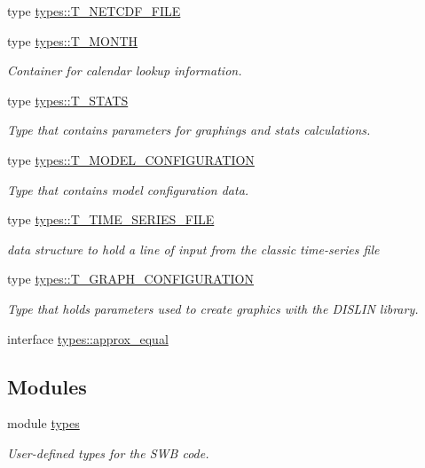 \begin{DoxyCompactItemize}
type \hyperlink{typetypes_1_1_t___n_e_t_c_d_f___f_i_l_e}{types::T\_\-NETCDF\_\-FILE}
\item 
type \hyperlink{typetypes_1_1_t___m_o_n_t_h}{types::T\_\-MONTH}
\begin{DoxyCompactList}\small\item\em Container for calendar lookup information. \item\end{DoxyCompactList}\item 
type \hyperlink{typetypes_1_1_t___s_t_a_t_s}{types::T\_\-STATS}
\begin{DoxyCompactList}\small\item\em Type that contains parameters for graphings and stats calculations. \item\end{DoxyCompactList}\item 
type \hyperlink{typetypes_1_1_t___m_o_d_e_l___c_o_n_f_i_g_u_r_a_t_i_o_n}{types::T\_\-MODEL\_\-CONFIGURATION}
\begin{DoxyCompactList}\small\item\em Type that contains model configuration data. \item\end{DoxyCompactList}\item 
type \hyperlink{typetypes_1_1_t___t_i_m_e___s_e_r_i_e_s___f_i_l_e}{types::T\_\-TIME\_\-SERIES\_\-FILE}
\begin{DoxyCompactList}\small\item\em data structure to hold a line of input from the classic time-\/series file \item\end{DoxyCompactList}\item 
type \hyperlink{typetypes_1_1_t___g_r_a_p_h___c_o_n_f_i_g_u_r_a_t_i_o_n}{types::T\_\-GRAPH\_\-CONFIGURATION}
\begin{DoxyCompactList}\small\item\em Type that holds parameters used to create graphics with the DISLIN library. \item\end{DoxyCompactList}\item 
interface \hyperlink{interfacetypes_1_1approx__equal}{types::approx\_\-equal}
\end{DoxyCompactItemize}
\subsection*{Modules}
\begin{DoxyCompactItemize}
\item 
module \hyperlink{namespacetypes}{types}


\begin{DoxyCompactList}\small\item\em User-\/defined types for the SWB code. \item\end{DoxyCompactList}

\end{DoxyCompactItemize}
